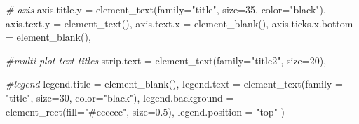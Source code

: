 \documentclass[
]{article}
\newenvironment{Shaded}{\begin{snugshade}}{\end{snugshade}}
\newcommand{\AttributeTok}[1]{\textcolor[rgb]{0.77,0.63,0.00}{#1}}
\newcommand{\CommentTok}[1]{\textcolor[rgb]{0.56,0.35,0.01}{\textit{#1}}}
\newcommand{\DecValTok}[1]{\textcolor[rgb]{0.00,0.00,0.81}{#1}}
\newcommand{\FloatTok}[1]{\textcolor[rgb]{0.00,0.00,0.81}{#1}}
\newcommand{\FunctionTok}[1]{\textcolor[rgb]{0.00,0.00,0.00}{#1}}
\newcommand{\NormalTok}[1]{#1}
\newcommand{\StringTok}[1]{\textcolor[rgb]{0.31,0.60,0.02}{#1}}
\begin{document}
\begin{Shaded}
\begin{Highlighting}[]
  \CommentTok{\# axis}
  \AttributeTok{axis.title.y =} \FunctionTok{element\_text}\NormalTok{(}\AttributeTok{family=}\StringTok{"title"}\NormalTok{, }\AttributeTok{size=}\DecValTok{35}\NormalTok{, }\AttributeTok{color=}\StringTok{"black"}\NormalTok{),}
  \AttributeTok{axis.text.y =} \FunctionTok{element\_text}\NormalTok{(),}
  \AttributeTok{axis.text.x =} \FunctionTok{element\_blank}\NormalTok{(),}
  \AttributeTok{axis.ticks.x.bottom =} \FunctionTok{element\_blank}\NormalTok{(),}
  
  \CommentTok{\#multi{-}plot text titles}
  \AttributeTok{strip.text =} \FunctionTok{element\_text}\NormalTok{(}\AttributeTok{family=}\StringTok{"title2"}\NormalTok{, }\AttributeTok{size=}\DecValTok{20}\NormalTok{),}
  
  \CommentTok{\#legend}
  \AttributeTok{legend.title =} \FunctionTok{element\_blank}\NormalTok{(),}
  \AttributeTok{legend.text =} \FunctionTok{element\_text}\NormalTok{(}\AttributeTok{family =} \StringTok{"title"}\NormalTok{, }\AttributeTok{size=}\DecValTok{30}\NormalTok{, }\AttributeTok{color=}\StringTok{"black"}\NormalTok{),}
  \AttributeTok{legend.background =} \FunctionTok{element\_rect}\NormalTok{(}\AttributeTok{fill=}\StringTok{"\#cccccc"}\NormalTok{, }\AttributeTok{size=}\FloatTok{0.5}\NormalTok{),}
  \AttributeTok{legend.position =} \StringTok{"top"}
\NormalTok{)}
\end{Highlighting}
\end{Shaded}
\end{document}
